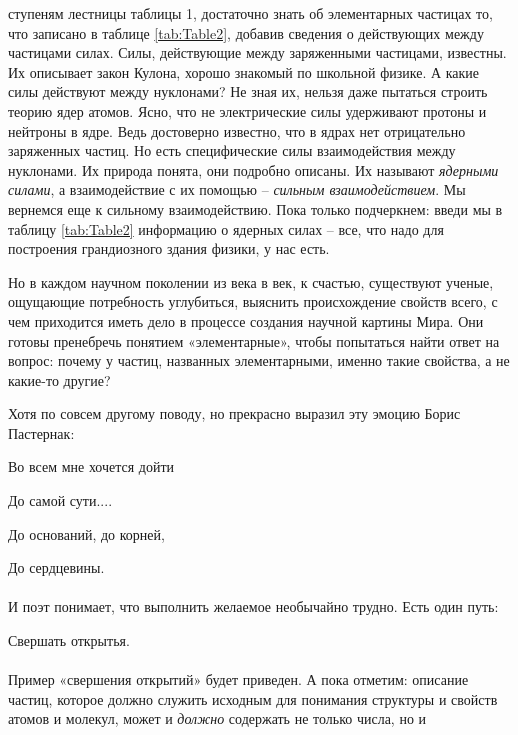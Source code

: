 \begin{multicols}{2}
ступеням лестницы таблицы 1, достаточно знать об
элементарных частицах то, что записано в таблице \ref{tab:Table2},
добавив сведения о действующих между частицами
силах. Силы, действующие между заряженными частицами, известны. Их описывает закон Кулона, хорошо
знакомый по школьной физике. А какие силы действуют между нуклонами? Не зная их, нельзя даже пытаться строить теорию ядер атомов. Ясно, что не электрические силы удерживают протоны и нейтроны в ядре.
Ведь достоверно известно, что в ядрах нет отрицательно
заряженных частиц. Но есть специфические силы
взаимодействия между нуклонами. Их природа понята,
они подробно описаны. Их называют \textit{ядерными силами},
а взаимодействие с их помощью – \textit{сильным взаимодействием}. Мы вернемся еще к сильному взаимодействию.
Пока только подчеркнем: введи мы в таблицу \ref{tab:Table2} информацию о ядерных силах – все, что надо для построения
грандиозного здания физики, у нас есть.
\par
Но в каждом научном поколении из века в век, к
счастью, существуют ученые, ощущающие потребность
углубиться, выяснить происхождение свойств всего, с
чем приходится иметь дело в процессе создания научной картины Мира. Они готовы пренебречь понятием
«элементарные», чтобы попытаться найти ответ на
вопрос: почему у частиц, названных элементарными,
именно такие свойства, а не какие-то другие?
\par
Хотя по совсем другому поводу, но прекрасно выразил эту эмоцию Борис Пастернак:
\\
\par Во всем мне хочется дойти
\par До самой сути....
\par До оснований, до корней,
\par До сердцевины. \\
\\
И поэт понимает, что выполнить желаемое необычайно
трудно. Есть один путь:
\\
\par Свершать открытья. \\
\\
Пример «свершения открытий» будет приведен. А
пока отметим: описание частиц, которое должно служить исходным для понимания структуры и свойств
атомов и молекул, может и \textit{должно} содержать не только числа, но и


\end{multicols}
